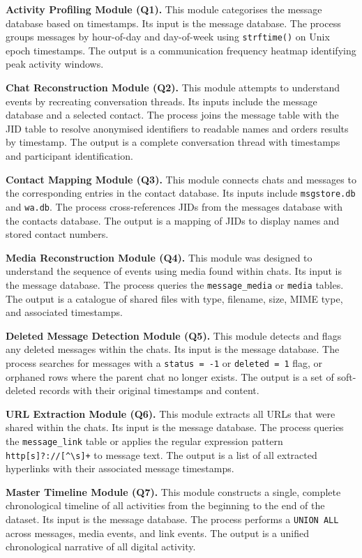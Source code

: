 \documentclass[12pt,a4paper]{report}
\begin{document}
\textbf{Activity Profiling Module (Q1).} This module categorises the message database based on timestamps. Its input is the message database. The process groups messages by hour-of-day and day-of-week using \texttt{strftime()} on Unix epoch timestamps. The output is a communication frequency heatmap identifying peak activity windows.

\textbf{Chat Reconstruction Module (Q2).} This module attempts to understand events by recreating conversation threads. Its inputs include the message database and a selected contact. The process joins the message table with the JID table to resolve anonymised identifiers to readable names and orders results by timestamp. The output is a complete conversation thread with timestamps and participant identification.

\textbf{Contact Mapping Module (Q3).} This module connects chats and messages to the corresponding entries in the contact database. Its inputs include \texttt{msgstore.db} and \texttt{wa.db}. The process cross-references JIDs from the messages database with the contacts database. The output is a mapping of JIDs to display names and stored contact numbers.

\textbf{Media Reconstruction Module (Q4).} This module was designed to understand the sequence of events using media found within chats. Its input is the message database. The process queries the \texttt{message\_media} or \texttt{media} tables. The output is a catalogue of shared files with type, filename, size, MIME type, and associated timestamps.

\textbf{Deleted Message Detection Module (Q5).} This module detects and flags any deleted messages within the chats. Its input is the message database. The process searches for messages with a \texttt{status = -1} or \texttt{deleted = 1} flag, or orphaned rows where the parent chat no longer exists. The output is a set of soft-deleted records with their original timestamps and content.

\textbf{URL Extraction Module (Q6).} This module extracts all URLs that were shared within the chats. Its input is the message database. The process queries the \texttt{message\_link} table or applies the regular expression pattern \texttt{http[s]?://[\textasciicircum\textbackslash s]+} to message text. The output is a list of all extracted hyperlinks with their associated message timestamps.

\textbf{Master Timeline Module (Q7).} This module constructs a single, complete chronological timeline of all activities from the beginning to the end of the dataset. Its input is the message database. The process performs a \texttt{UNION ALL} across messages, media events, and link events. The output is a unified chronological narrative of all digital activity.
\end{document}
